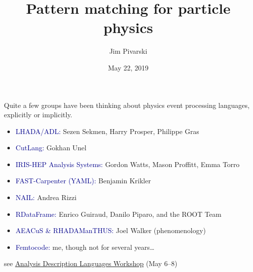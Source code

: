 \documentclass[aspectratio=169]{beamer}
\title[2019-05-22-pattern-matching-irishep]{Pattern matching for particle physics}
\author{Jim Pivarski}
\institute{Princeton University -- IRIS-HEP}
\date{May 22, 2019}
\begin{document}

\begin{frame}
  \titlepage
\end{frame}




\begin{frame}{}
\large
\vspace{1.25 cm}
Quite a few groups have been thinking about physics event processing languages, explicitly or implicitly.

\vspace{0.25 cm}
\begin{itemize}
\item \textcolor{darkblue}{LHADA/ADL:} Sezen Sekmen, Harry Prosper, Philippe Gras
\item \textcolor{darkblue}{CutLang:} Gokhan Unel
\item \textcolor{darkblue}{IRIS-HEP Analysis Systems:} Gordon Watts, Mason Proffitt, Emma Torro
\item \textcolor{darkblue}{FAST-Carpenter (YAML):} Benjamin Krikler
\item \textcolor{darkblue}{NAIL:} Andrea Rizzi
\item \textcolor{darkblue}{RDataFrame:} Enrico Guiraud, Danilo Piparo, and the ROOT Team
\item \textcolor{darkblue}{AEACuS \& RHADAManTHUS:} Joel Walker (phenomenology)
\item \textcolor{darkblue}{Femtocode:} me, though not for several years\ldots
\end{itemize}

\vspace{0.25 cm}
\small \hfill see \textcolor{blue}{\href{https://indico.cern.ch/event/769263/timetable/}{Analysis Description Languages Workshop}} (May 6--8)
\end{frame}
\end{document}
